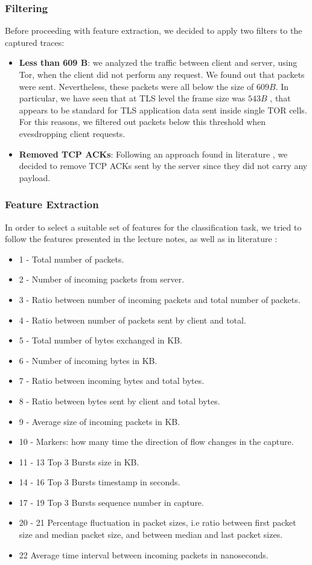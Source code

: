 \documentclass[10pt,conference,compsocconf]{IEEEtran}
\begin{document}
\subsubsection{Filtering}
Before proceeding with feature extraction, we decided to apply two filters to the captured traces:
\begin{itemize}
    \item \textbf{Less than 609 B}: we analyzed the traffic between client and server, using Tor, when the client did not perform any request. We found out that packets were sent. Nevertheless, these packets were all below the size of $609B$. In particular, we have seen that at TLS level the frame size was $543 B$ , that appears to be standard for TLS application data sent inside single TOR cells.  For this reasons, we filtered out packets below this threshold when evesdropping client requests.
    \item \textbf{Removed TCP ACKs}: Following an approach found in literature \cite{web_fingerprinting}, we decided to remove TCP ACKs sent by the server since they did not carry any payload.
\end{itemize}
\subsubsection{Feature Extraction}
In order to select a suitable set of features for the classification task, we tried to follow the features presented in the lecture notes, as well as in literature \cite{web_fingerprinting}:
\begin{itemize}
    \item 1 - Total number of packets.
    \item 2 - Number of incoming packets from server.
    \item 3 - Ratio between number of incoming packets and total number of packets.
    \item 4 - Ratio between number of packets sent by client and total.
    \item 5 - Total number of bytes exchanged in KB.
    \item 6 - Number of incoming bytes in KB.
    \item 7 - Ratio between incoming bytes and total bytes.
    \item 8 - Ratio between bytes sent by client and total bytes.
    \item 9 - Average size of incoming packets in KB.
    \item 10 - Markers: how many time the direction of flow changes in the capture.
    \item 11 - 13 Top 3 Bursts size in KB.
    \item 14 - 16 Top 3 Bursts timestamp in seconds.
    \item 17 - 19 Top 3 Bursts sequence number in capture.
    \item 20 - 21 Percentage fluctuation in packet sizes, i.e ratio between first packet size and median packet size, and between median and last packet sizes.
    \item 22 Average time interval between incoming packets in nanoseconds.
\end{itemize}
\end{document}

